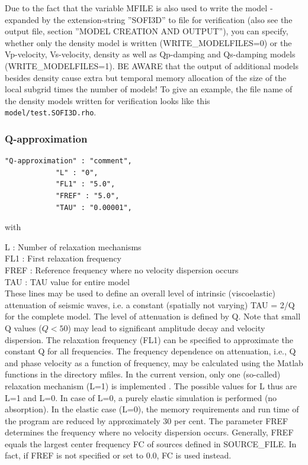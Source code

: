 \documentclass[11pt,onecolumn,oneside]{article}
\begin{document}
Due to the fact that the variable MFILE is also used to write the model - expanded by the extension-string ''SOFI3D'' to file for verification (also see the output file, section ''MODEL CREATION AND OUTPUT''), you can specify, whether only the density model is written (WRITE\_MODELFILES=0) or the Vp-velocity, Vs-velocity, density as well as Qp-damping and Qs-damping models (WRITE\_MODELFILES=1). BE AWARE that the output of additional models besides density cause extra but temporal memory allocation of the size of the local subgrid times the number of models! To give an example, the file name of the density models written for verification looks like this  \lstinline{model/test.SOFI3D.rho}.

\subsubsection{Q-approximation}
\begin{verbatim}
"Q-approximation" : "comment",
			"L" : "0",
			"FL1" : "5.0", 
			"FREF" : "5.0",
			"TAU" : "0.00001",
\end{verbatim}

with

L : Number of relaxation mechanisms\\
FL1 : First relaxation frequency \\
FREF : Reference frequency where no velocity dispersion occurs \\
TAU : TAU value for entire model\\

These lines may be used to define an overall level of intrinsic (viscoelastic) attenuation of seismic waves, i.e. a constant (spatially not varying) TAU = 2/Q for the complete model. The level of attenuation is defined by Q. Note that small Q values ($Q<50$) may lead to significant amplitude decay and velocity dispersion. The relaxation frequency (FL1) can be specified to approximate the constant Q for all frequencies. The frequency dependence on attenuation, i.e., Q and phase velocity as a function  of frequency, may be calculated using the Matlab functions in the directory mfiles.
In the current version, only one (so-called) relaxation mechanism (L=1) is implemented \cite{bohlen:98,blanch:95,bohlen:02}. The possible values for L thus are L=1 and L=0. In case of L=0, a purely elastic simulation is performed (no absorption). In the elastic case (L=0), the memory requirements and run time of the program are reduced by approximately 30 per cent. The parameter FREF determines the frequency where no velocity dispersion occurs. Generally, FREF equals the largest center frequency FC of sources defined in SOURCE\_FILE. In fact, if FREF is not specified or set to 0.0, FC is used instead.
\end{document}
